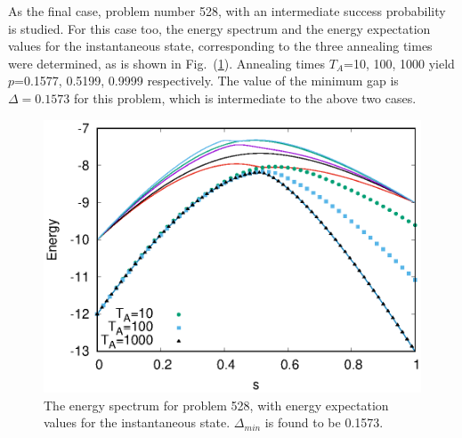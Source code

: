 \documentclass[../main.tex]{subfiles}
\begin{document}
As the final case, problem number 528, with an intermediate success probability is studied. For this case too, the energy spectrum and the energy expectation values for the instantaneous state, corresponding to the three annealing times were determined, as is shown in Fig.~(\ref{fig:o4}). Annealing times $T_A$=10, 100, 1000 yield $p$=0.1577, 0.5199, 0.9999 respectively. The value of the minimum gap is $\Delta=0.1573$ for this problem, which is intermediate to the above two cases. 
\begin{figure}[H]
\centering 
\includegraphics[scale=0.8]{528_s12_O.eps}
\caption{The energy spectrum for problem 528, with energy expectation values for the instantaneous state. $\Delta_{min}$ is found to be 0.1573.}
\label{fig:o4}
\end{figure}

\end{document}
